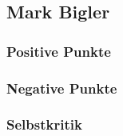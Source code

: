 \subsection{Mark Bigler}

\subsubsection{Positive Punkte}

\subsubsection{Negative Punkte}

\subsubsection{Selbstkritik}
